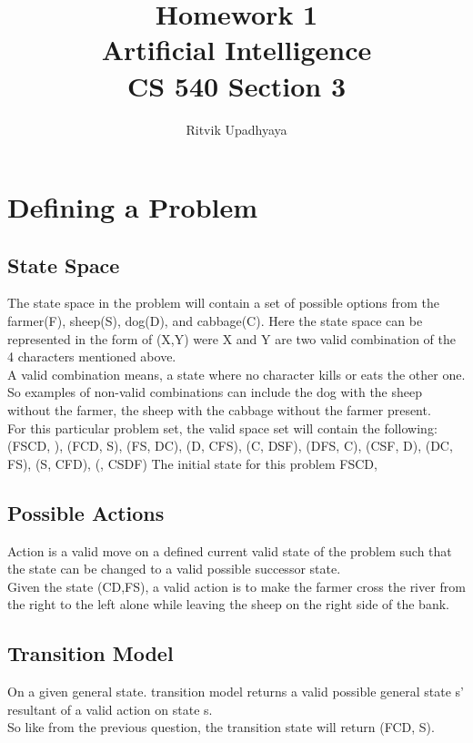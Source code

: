 \documentclass{article}
\title{\Huge Homework 1
		\\\LARGE Artificial Intelligence
		\\\LARGE CS 540 Section 3
		\vspace{2pc}}
\author{Ritvik Upadhyaya}
\date{}
\begin{document}
	\maketitle
	\newpage

	\tableofcontents

	\newpage

	\section{Defining a Problem}
    \vspace{2pc}
	\subsection{State Space}
        The state space in the problem will contain a set of possible options from the farmer(F), sheep(S), dog(D), and cabbage(C). Here the state space can be represented in the form of (X,Y) were X and Y are two valid combination of the 4 characters mentioned above.\\
        A valid combination means, a state where no character kills or eats the other one. So examples of non-valid combinations can include the dog with the sheep without the farmer, the sheep with the cabbage without the farmer present.\\
        For this particular problem set, the valid space set will contain the following:\\
        (FSCD, ), (FCD, S), (FS, DC), (D, CFS), (C, DSF), (DFS, C), (CSF, D),  (DC, FS), (S, CFD), (, CSDF)
        The initial state for this problem {FSCD, }
	\subsection{Possible Actions}
        Action is a valid move on a defined current valid state of the problem such that the state can be changed to a valid possible successor state.\\Given the state (CD,FS), a valid action is to make the farmer cross the river from the right to the left alone while leaving the sheep on the right side of the bank.
	\subsection{Transition Model}
        On a given general state. transition model returns a valid possible general state s' resultant of a valid action on state s.\\So like from the previous question, the transition state will return (FCD, S).
\end{document}

